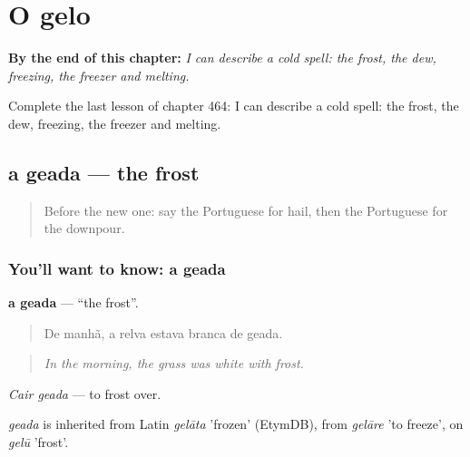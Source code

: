 
\chapter{O gelo}
\label{ch:pt-o-gelo}

\begin{chapteropening}
\textbf{By the end of this chapter:} \emph{I can describe a cold spell: the frost, the dew, freezing, the freezer and melting.}

Complete the last lesson of chapter 464: I can describe a cold spell: the frost, the dew, freezing, the freezer and melting.
\end{chapteropening}

\section[a geada]{a geada — the frost}

\label{lesson:PT-C464-geada}



\begin{quote}
Before the new one: say the Portuguese for hail, then the Portuguese for the downpour.
\end{quote}

\subsection*{You'll want to know: a geada}
\textbf{a geada} — \textquotedblleft{}the frost\textquotedblright{}.

\begin{quote}
De manhã, a relva estava branca de geada.
\end{quote}

\begin{quote}
\emph{In the morning, the grass was white with frost.}
\end{quote}

\emph{Cair geada} — to frost over.

\begin{cousinweb}
\emph{geada} is inherited from Latin \emph{gelāta} 'frozen' (EtymDB), from \emph{gelāre} 'to freeze', on \emph{gelū} 'frost'.
\end{cousinweb}

